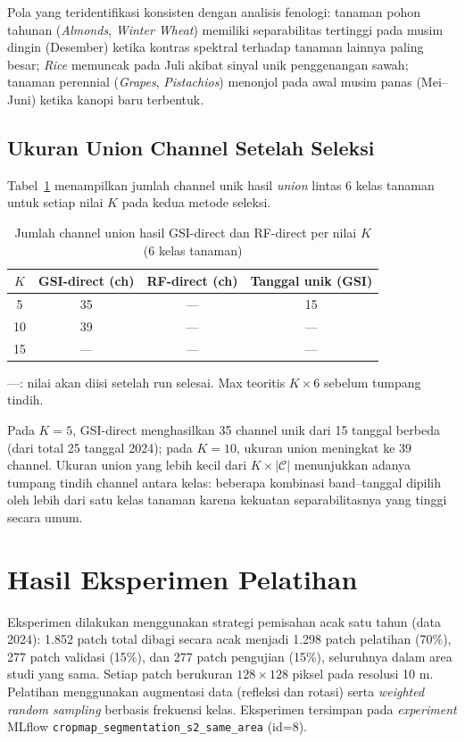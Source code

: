 Pola yang teridentifikasi konsisten dengan analisis fenologi: tanaman pohon tahunan (\textit{Almonds}, \textit{Winter Wheat}) memiliki separabilitas tertinggi pada musim dingin (Desember) ketika kontras spektral terhadap tanaman lainnya paling besar; \textit{Rice} memuncak pada Juli akibat sinyal unik penggenangan sawah; tanaman perennial (\textit{Grapes}, \textit{Pistachios}) menonjol pada awal musim panas (Mei--Juni) ketika kanopi baru terbentuk.

\subsection{Ukuran Union Channel Setelah Seleksi}

Tabel~\ref{tab:union_sizes} menampilkan jumlah channel unik hasil \textit{union} lintas 6 kelas tanaman untuk setiap nilai $K$ pada kedua metode seleksi.

\begin{table}[H]
    \centering
    \caption{Jumlah channel union hasil GSI-direct dan RF-direct per nilai $K$ (6 kelas tanaman)}
    \label{tab:union_sizes}
    \begin{tabular}{|c|c|c|c|}
    \hline
    $K$ & \textbf{GSI-direct (ch)} & \textbf{RF-direct (ch)} & \textbf{Tanggal unik (GSI)} \\
    \hline
    5  & 35  & --- & 15 \\
    10 & 39  & --- & --- \\
    15 & --- & --- & --- \\
    \hline
    \end{tabular}
    \par\smallskip
    {\footnotesize ---: nilai akan diisi setelah run selesai. Max teoritis $K \times 6$ sebelum tumpang tindih.}
\end{table}

Pada $K=5$, GSI-direct menghasilkan 35 channel unik dari 15 tanggal berbeda (dari total 25 tanggal 2024); pada $K=10$, ukuran union meningkat ke 39 channel.
Ukuran union yang lebih kecil dari $K \times |\mathcal{C}|$ menunjukkan adanya tumpang tindih channel antara kelas: beberapa kombinasi band--tanggal dipilih oleh lebih dari satu kelas tanaman karena kekuatan separabilitasnya yang tinggi secara umum.

\section{Hasil Eksperimen Pelatihan}

Eksperimen dilakukan menggunakan strategi pemisahan acak satu tahun (data 2024): 1.852 patch total dibagi secara acak menjadi 1.298 patch pelatihan (70\%), 277 patch validasi (15\%), dan 277 patch pengujian (15\%), seluruhnya dalam area studi yang sama.
Setiap patch berukuran $128\times128$ piksel pada resolusi 10 m.
Pelatihan menggunakan augmentasi data (refleksi dan rotasi) serta \textit{weighted random sampling} berbasis frekuensi kelas.
Eksperimen tersimpan pada \textit{experiment} MLflow \texttt{cropmap\_segmentation\_s2\_same\_area} (id=8).


